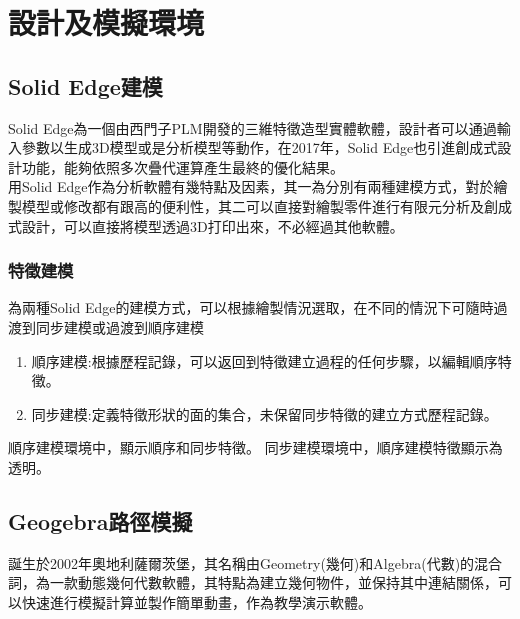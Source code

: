 \chapter{設計及模擬環境}

\section{Solid Edge建模}
Solid Edge為一個由西門子PLM開發的三維特徵造型實體軟體，設計者可以通過輸入參數以生成3D模型或是分析模型等動作，在2017年，Solid Edge也引進創成式設計功能，能夠依照多次疊代運算產生最終的優化結果。\\

用Solid Edge作為分析軟體有幾特點及因素，其一為分別有兩種建模方式，對於繪製模型或修改都有跟高的便利性，其二可以直接對繪製零件進行有限元分析及創成式設計，可以直接將模型透過3D打印出來，不必經過其他軟體。\\

\subsection{特徵建模}
為兩種Solid Edge的建模方式，可以根據繪製情況選取，在不同的情況下可隨時過渡到同步建模或過渡到順序建模\\

\begin{enumerate}
\item 順序建模:根據歷程記錄，可以返回到特徵建立過程的任何步驟，以編輯順序特徵。
\item 同步建模:定義特徵形狀的面的集合，未保留同步特徵的建立方式歷程記錄。\\
\end{enumerate}

順序建模環境中，顯示順序和同步特徵。
同步建模環境中，順序建模特徵顯示為透明。\\

\section{Geogebra路徑模擬}
誕生於2002年奧地利薩爾茨堡，其名稱由Geometry(幾何)和Algebra(代數)的混合詞，為一款動態幾何代數軟體，其特點為建立幾何物件，並保持其中連結關係，可以快速進行模擬計算並製作簡單動畫，作為教學演示軟體。\\

